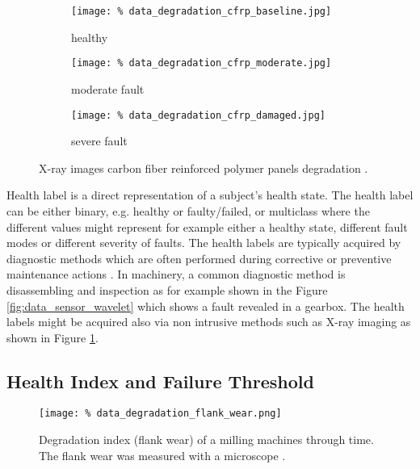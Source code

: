 \begin{figure}
    \centering
    \begin{subfigure}{.33\textwidth}
        \texttt{[image: \%
            data\_degradation\_cfrp\_baseline.jpg]}
        \caption{healthy}
    \end{subfigure}%
    \begin{subfigure}{.33\textwidth}
        \texttt{[image: \%
            data\_degradation\_cfrp\_moderate.jpg]}
        \caption{moderate fault}
    \end{subfigure}%
    \begin{subfigure}{.33\textwidth}
        \texttt{[image: \%
            data\_degradation\_cfrp\_damaged.jpg]}
        \caption{severe fault}
    \end{subfigure}
    \caption{X-ray images carbon fiber reinforced polymer panels degradation
             \cite{data_set_cfrp}.}
    \label{fig:data_degradation_cfrp}
\end{figure}

Health label is a direct representation of a subject's health state.
The health label can be either binary, e.g. healthy or faulty/failed, or multiclass where the different values might represent for example either a healthy state, different fault modes or different severity of faults.
The health labels are typically acquired by diagnostic methods which are often performed during corrective or preventive maintenance actions \cite{Dua:2019}.
In machinery, a common diagnostic method is disassembling and inspection \cite{lei2018machinery} as for example shown in the Figure \ref{fig:data_sensor_wavelet} which shows a fault revealed in a gearbox.
The health labels might be acquired also via non intrusive methods such as X-ray imaging as shown in Figure \ref{fig:data_degradation_cfrp}.

\subsection{Health Index and Failure Threshold}

\begin{figure}
    \texttt{[image: \%
        data\_degradation\_flank\_wear.png]}
	\centering
	\caption{Degradation index (flank wear) of a milling machines through time. The flank
	         wear was measured with a microscope \cite{data_set_milling}.}
	\label{fig:data_degradation_flank_wear}
\end{figure}

